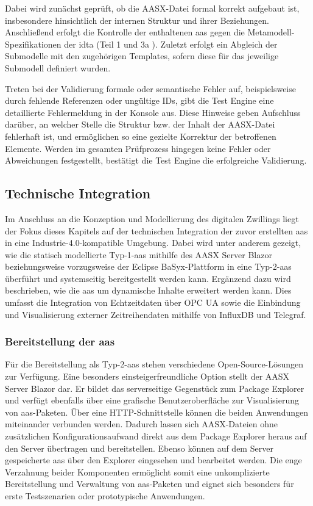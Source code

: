 Dabei wird zunächst geprüft, ob die AASX-Datei formal korrekt aufgebaut ist, insbesondere hinsichtlich der internen Struktur und ihrer Beziehungen.
Anschließend erfolgt die Kontrolle der enthaltenen \acs{aas} gegen die Metamodell-Spezifikationen der \acs{idta} (Teil 1 \cite{SpezifikationPart1} und 3a \cite{SpezifikationPart3a}).
Zuletzt erfolgt ein Abgleich der Submodelle mit den zugehörigen Templates, sofern diese für das jeweilige Submodell definiert wurden.

Treten bei der Validierung formale oder semantische Fehler auf, beispielsweise durch fehlende Referenzen oder ungültige IDs, gibt die Test Engine eine detaillierte Fehlermeldung in der Konsole aus. 
Diese Hinweise geben Aufschluss darüber, an welcher Stelle die Struktur bzw. der Inhalt der AASX-Datei fehlerhaft ist, und ermöglichen so eine gezielte Korrektur der betroffenen Elemente. 
Werden im gesamten Prüfprozess hingegen keine Fehler oder Abweichungen festgestellt, bestätigt die Test Engine die erfolgreiche Validierung.

\newpage
\subsection{Technische Integration}
Im Anschluss an die Konzeption und Modellierung des digitalen Zwillings liegt der Fokus dieses Kapitels auf der technischen Integration der zuvor erstellten \acs{aas} in eine Industrie-4.0-kompatible Umgebung.
Dabei wird unter anderem gezeigt, wie die statisch modellierte Typ-1-\acs{aas} mithilfe des AASX Server Blazor beziehungsweise vorzugsweise der Eclipse BaSyx-Plattform in eine Typ-2-\acs{aas} überführt und systemseitig bereitgestellt werden kann.
Ergänzend dazu wird beschrieben, wie die \acs{aas} um dynamische Inhalte erweitert werden kann.
Dies umfasst die Integration von Echtzeitdaten über OPC UA sowie die Einbindung und Visualisierung externer Zeitreihendaten mithilfe von InfluxDB und Telegraf.

\subsubsection{Bereitstellung der \acs{aas}}
\label{sec:bereitstellungAAS}
Für die Bereitstellung als Typ-2-\acs{aas} stehen verschiedene Open-Source-Lösungen zur Verfügung. 
Eine besonders einsteigerfreundliche Option stellt der AASX Server Blazor \cite{AASXServer} dar.
Er bildet das serverseitige Gegenstück zum Package Explorer und verfügt ebenfalls über eine grafische Benutzeroberfläche zur Visualisierung von \acs{aas}-Paketen.
Über eine HTTP-Schnittstelle können die beiden Anwendungen miteinander verbunden werden.
Dadurch lassen sich AASX-Dateien ohne zusätzlichen Konfigurationsaufwand direkt aus dem Package Explorer heraus auf den Server übertragen und bereitstellen.
Ebenso können auf dem Server gespeicherte \acs{aas} über den Explorer eingesehen und bearbeitet werden.
Die enge Verzahnung beider Komponenten ermöglicht somit eine unkomplizierte Bereitstellung und Verwaltung von \acs{aas}-Paketen und eignet sich besonders für erste Testszenarien oder prototypische Anwendungen.

